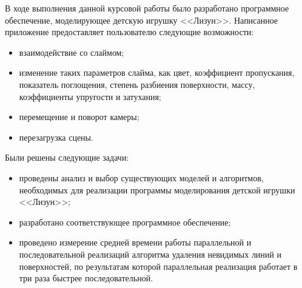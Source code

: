 
В ходе выполнения данной курсовой работы было разработано программное обеспечение, моделирующее детскую игрушку <<Лизун>>. Написанное приложение предоставляет пользователю следующие возможности:

\begin{itemize}
	\item взаимодействие со слаймом;
	\item изменение таких параметров слайма, как цвет, коэффициент пропускания, показатель поглощения, степень разбиения поверхности, массу, коэффициенты упругости и затухания;
	\item перемещение и поворот камеры;
	\item перезагрузка сцены.
\end{itemize}

Были решены следующие задачи:
\begin{itemize}
	\item проведены анализ и выбор существующих моделей и алгоритмов, необходимых для реализации программы моделирования детской игрушки <<Лизун>>;
	\item разработано соответствующее программное обеспечение;
	\item проведено измерение средней времени работы параллельной и последовательной реализаций алгоритма удаления невидимых линий и поверхностей, по результатам которой параллельная реализация работает в три раза быстрее последовательной.
\end{itemize}
